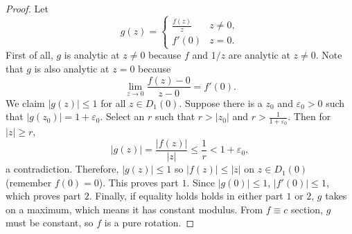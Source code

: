 \begin{proof}
    Let
    \[
        g(z) = \begin{cases}
            \frac{f(z)}{z} & z \ne 0, \\
            f'(0) & z = 0.
        \end{cases}
    \]
    First of all, $g$ is analytic at $z \ne 0$ because 
    $f$ and $1/z$ are analytic at $z \ne 0$.
    Note that $g$ is also analytic at $z=0$ because 
    \[ \lim_{z \to 0} \frac{f(z) - 0}{z - 0} = f'(0). \]
    We claim $|g(z)| \le 1$ for all $z \in D_1(0)$.
    Suppose there is a $z_0$ and $\varepsilon_0 > 0$
    such that $|g(z_0)| = 1 + \varepsilon_0$.
    Select an $r$ such that $r > |z_0|$ and $r > \frac{1}{1+\varepsilon_0}$.
    Then for $|z| \ge r$,
    \[ |g(z)| = \frac{|f(z)|}{|z|} \le \frac{1}{r} < 1 + 
    \varepsilon_0, \]
    a contradiction.
    Therefore, $|g(z)| \le 1$ so $|f(z)| \le |z|$ on $z \in D_1(0)$
    (remember $f(0)=0$). 
    This proves part $1$.
    Since $|g(0)| \le 1$, $|f'(0)| \le 1$, which proves part $2$.
    Finally, if equality holds holds in either part $1$ or $2$,
    $g$ takes on a maximum, which means
    it has constant modulus.
    From $f \equiv c$ section, $g$ must be constant, so
    $f$ is a pure rotation.

\end{proof}
